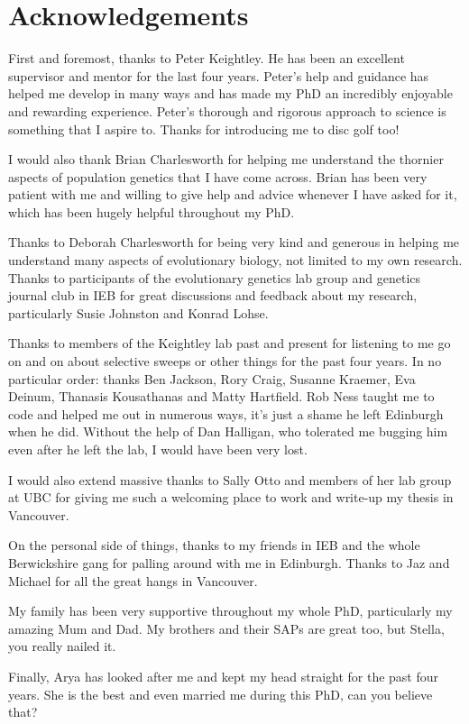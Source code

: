 \chapter{Acknowledgements}

First and foremost, thanks to Peter Keightley. He has been an excellent supervisor and mentor for the last four years. Peter's help and guidance has helped me develop in many ways and has made my PhD an incredibly enjoyable and rewarding experience. Peter's thorough and rigorous approach to science is something that I aspire to. Thanks for introducing me to disc golf too!

I would also thank Brian Charlesworth for helping me understand the thornier aspects of population genetics that I have come across. Brian has been very patient with me and willing to give help and advice whenever I have asked for it, which has been hugely helpful throughout my PhD.

Thanks to Deborah Charlesworth for being very kind and generous in helping me understand many aspects of evolutionary biology, not limited to my own research. Thanks to participants of the evolutionary genetics lab group and genetics journal club in IEB for great discussions and feedback about my research, particularly Susie Johnston and Konrad Lohse.

Thanks to members of the Keightley lab past and present for listening to me go on and on about selective sweeps or other things for the past four years. In no particular order: thanks Ben Jackson, Rory Craig, Susanne Kraemer, Eva Deinum, Thanasis Kousathanas and Matty Hartfield. Rob Ness taught me to code and helped me out in numerous ways, it's just a shame he left Edinburgh when he did. Without the help of Dan Halligan, who tolerated me bugging him even after he left the lab, I would have been very lost.

I would also extend massive thanks to Sally Otto and members of her lab group at UBC for giving me such a welcoming place to work and write-up my thesis in Vancouver.

On the personal side of things, thanks to my friends in IEB and the whole Berwickshire gang for palling around with me in Edinburgh. Thanks to Jaz and Michael for all the great hangs in Vancouver. 

My family has been very supportive throughout my whole PhD, particularly my amazing Mum and Dad. My brothers and their SAPs are great too, but Stella, you really nailed it.

Finally, Arya has looked after me and kept my head straight for the past four years. She is the best and even married me during this PhD, can you believe that?
